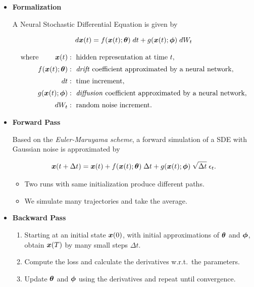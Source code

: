 \begin{itemize}

\item \textbf{Formalization}

A Neural Stochastic Differential Equation is given by

\begin{equation}\label{NeuralSDE}
d\boldsymbol{x}(t) = f(\boldsymbol{x}(t); \boldsymbol{\theta}) \; dt + g(\boldsymbol{x}(t); \boldsymbol{\phi}) \; dW_t
\end{equation}

\begin{align*}
\text{where } \qquad \boldsymbol{x}(t) &: \text{ hidden representation at time }t, \\[0.2em]
f(\boldsymbol{x}(t); \boldsymbol{\theta}) &: \text{ \textit{drift} coefficient approximated by a neural network}, \\[0.2em]
dt &: \text{ time increment}, \\[0.2em]
g(\boldsymbol{x}(t); \boldsymbol{\phi}) &: \text{ \textit{diffusion} coefficient approximated by a neural network}, \\[0.2em]
dW_t &: \text{ random noise increment.}
\end{align*}


\item \textbf{Forward Pass}

Based on the \textit{Euler-Maruyama scheme}, a forward simulation of a SDE with Gaussian noise is approximated by

\begin{equation}\label{Euler-Maruyama_ForwardPass}
\boldsymbol{x}(t+\Delta t)
=
\boldsymbol{x}(t)
+
f(\boldsymbol{x}(t); \boldsymbol{\theta}) \; \Delta t
+
g(\boldsymbol{x}(t); \boldsymbol{\phi}) \; \sqrt{\Delta t} \; \epsilon_t.
\end{equation}

\begin{itemize}

\item Two runs with same initialization produce different paths.

\item We simulate many trajectories and take the average.

\end{itemize}



\item \textbf{Backward Pass}

\begin{enumerate}

\item Starting at an initial state $\boldsymbol{x}(0)$, with initial approximations of $\boldsymbol{\theta}$ and $\boldsymbol{\phi}$, obtain $\boldsymbol{x}(T)$ by many small steps $\Delta t$.

\item Compute the loss and calculate the derivatives w.r.t.\ the parameters.

\item Update $\boldsymbol{\theta}$ and $\boldsymbol{\phi}$ using the derivatives and repeat until convergence.

\end{enumerate}

\end{itemize}

